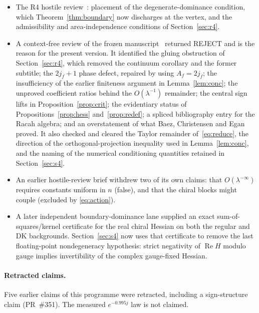 \documentclass[11pt]{article}
\numberwithin{equation}{section}
\theoremstyle{definition}
\theoremstyle{remark}
\renewcommand{\Re}{\operatorname{Re}}
\begin{document}
\begin{itemize}
distance from the rank-one orbits, and noted that the evidence bundle claimed a
completeness it did not have. It checked and cleared the rank-one absolute-value
estimate, the cubic cofactor count, the separation of boundary-state from
$X$-space statements, and the repaired citations.
\item The R4 hostile review~\cite{R4review}: placement of the
degenerate-dominance condition, which Theorem~\ref{thm:boundary} now discharges at
the vertex, and the admissibility and area-independence conditions of
Section~\ref{sec:r4}.
\item A context-free review of the frozen manuscript~\cite{PR357} returned
REJECT and is the reason for the present version. It identified the gluing
obstruction of Section~\ref{sec:r4}, which removed the continuum corollary and
the former subtitle; the $2j_f+1$ phase defect, repaired by using $A_f=2j_f$; the
insufficiency of the earlier finiteness argument in Lemma~\ref{lem:conc}; the
unproved coefficient ratios behind the $O(\lambda^{-1})$ remainder; the central
sign lifts in Proposition~\ref{prop:crit}; the evidentiary status of
Propositions~\ref{prop:hess} and~\ref{prop:redef}; a spliced bibliography entry
for the Racah algebra; and an overstatement of what Baez, Christensen and Egan
proved. It also checked and cleared the Taylor remainder of~\eqref{eq:reduce},
the direction of the orthogonal-projection inequality used in
Lemma~\ref{lem:conc}, and the naming of the numerical conditioning quantities
retained in Section~\ref{sec:s4}.
\item An earlier hostile-review brief withdrew two of its own claims: that
$O(\lambda^{-\infty})$ requires constants uniform in $n$ (false), and that the
chiral blocks might couple (excluded by \eqref{eq:action}).
\item A later independent boundary-dominance lane supplied an exact
sum-of-squares/kernel certificate for the real chiral Hessian on both the
regular and DK backgrounds. Section~\ref{sec:s4} now uses that certificate to
remove the last floating-point nondegeneracy hypothesis: strict negativity of
$\Re H$ modulo gauge implies invertibility of the complex gauge-fixed Hessian.
\end{itemize}

\paragraph{Retracted claims.}
Five earlier claims of this programme were retracted, including a sign-structure
claim (PR~\#351). The measured $e^{-0.995j}$ law is not claimed.
\end{document}
